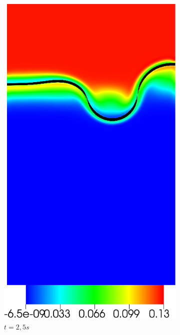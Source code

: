 \begin{figure}[H]
\begin{subfigure}[ht!]{0.2\textwidth}
		\includegraphics[width=1\textwidth]{figure/PT_RT/concent0/visit0009.png}
		\caption{$t=2,5s$}
	\end{subfigure}
	\begin{subfigure}[ht!]{0.2\textwidth}
		\centering

\end{subfigure}
\end{figure}
